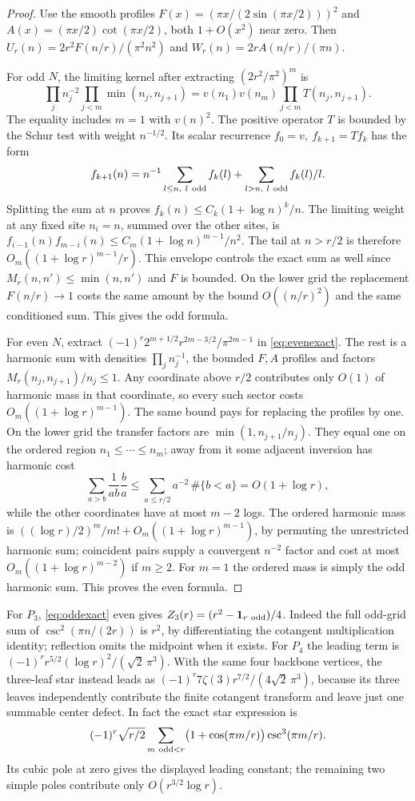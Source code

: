 \begin{proof}
Use the smooth profiles \(F(x)=(\pi x/(2\sin(\pi x/2)))^2\) and \(A(x)=(\pi x/2)\cot(\pi x/2)\), both \(1+O(x^2)\) near zero. Then \(U_r(n)=2r^2F(n/r)/(\pi^2 n^2)\) and \(W_r(n)=2r A(n/r)/(\pi n)\).

For odd \(N\), the limiting kernel after extracting \((2r^2/\pi^2)^m\) is
\[
 \prod_j n_j^{-2}\prod_{j<m}\min(n_j,n_{j+1})
       =v(n_1)v(n_m)\prod_{j<m}T(n_j,n_{j+1}).
\]
The equality includes \(m=1\) with \(v(n)^2\). The positive operator \(T\) is bounded by the Schur test with weight \(n^{-1/2}\). Its scalar recurrence \(f_0=v,\ f_{k+1}=Tf_k\) has the form
\[
 f_{k+1}(n)=n^{-1}\sum_{l\le n,\ l\ {\rm odd}}f_k(l)
              +\sum_{l>n,\ l\ {\rm odd}}f_k(l)/l .
\]
Splitting the sum at \(n\) proves \(f_k(n)\le C_k(1+\log n)^k/n\). The limiting weight at any fixed site \(n_i=n\), summed over the other sites, is \(f_{i-1}(n)f_{m-i}(n)\le C_m(1+\log n)^{m-1}/n^2\). The tail at \(n>r/2\) is therefore \(O_m((1+\log r)^{m-1}/r)\). This envelope controls the exact sum as well since \(M_r(n,n')\le\min(n,n')\) and \(F\) is bounded. On the lower grid the replacement \(F(n/r)\to1\) costs the same amount by the bound \(O((n/r)^2)\) and the same conditioned sum. This gives the odd formula.

For even \(N\), extract \((-1)^r2^{m+1/2}r^{2m-3/2}/\pi^{2m-1}\) in \eqref{eq:evenexact}. The rest is a harmonic sum with densities \(\prod_j n_j^{-1}\), the bounded \(F,A\) profiles and factors \(M_r(n_j,n_{j+1})/n_j\le1\). Any coordinate above \(r/2\) contributes only \(O(1)\) of harmonic mass in that coordinate, so every such sector costs \(O_m((1+\log r)^{m-1})\). The same bound pays for replacing the profiles by one. On the lower grid the transfer factors are \(\min(1,n_{j+1}/n_j)\). They equal one on the ordered region \(n_1\le\cdots\le n_m\); away from it some adjacent inversion has harmonic cost
\[
   \sum_{a>b}\frac1{ab}\frac ba
             \le \sum_{a\le r/2}a^{-2}\,\#\{b<a\}=O(1+\log r),
\]
while the other coordinates have at most \(m-2\) logs. The ordered harmonic mass is \(((\log r)/2)^m/m!+O_m((1+\log r)^{m-1})\), by permuting the unrestricted harmonic sum; coincident pairs supply a convergent \(n^{-2}\) factor and cost at most \(O_m((1+\log r)^{m-2})\) if \(m\ge2\). For \(m=1\) the ordered mass is simply the odd harmonic sum. This proves the even formula.
\end{proof}

For \(P_3\), \eqref{eq:oddexact} even gives \(Z_3(r)=(r^2-\mathbf1_{r\ {\rm odd}})/4\). Indeed the full odd-grid sum of \(\csc^2(\pi n/(2r))\) is \(r^2\), by differentiating the cotangent multiplication identity; reflection omits the midpoint when it exists. For \(P_4\) the leading term is \((-1)^r r^{5/2}(\log r)^2/(\sqrt2\,\pi^3)\). With the same four backbone vertices, the three-leaf star instead leads as \((-1)^r7\zeta(3)r^{7/2}/(4\sqrt2\,\pi^3)\), because its three leaves independently contribute the finite cotangent transform and leave just one summable center defect. In fact the exact star expression is
\[
 (-1)^r\sqrt{r/2}\sum_{m\ {\rm odd}<r}
      \bigl(1+\cos(\pi m/r)\bigr)\csc^3(\pi m/r).
\]
Its cubic pole at zero gives the displayed leading constant; the remaining two simple poles contribute only \(O(r^{3/2}\log r)\).

